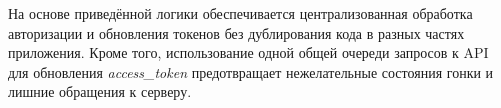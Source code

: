 На основе приведённой логики обеспечивается централизованная обработка авторизации и обновления токенов без дублирования кода в разных частях приложения. Кроме того, использование одной общей очереди запросов к API для обновления \textit{access\_token} предотвращает нежелательные состояния гонки и лишние обращения к серверу.
